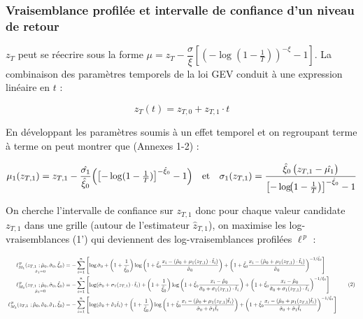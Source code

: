 \documentclass[
  article,
  nofooter,
  noheadings]{jss}
\begin{document}
\subsubsection{Vraisemblance profilée et intervalle de confiance d'un
niveau de
retour}\label{vraisemblance-profiluxe9e-et-intervalle-de-confiance-dun-niveau-de-retour}

\(z_T\) peut se réecrire sous la forme
\(\mu = z_T - \dfrac{\sigma}{\xi} \left[ \left( -\log\left(1 - \frac{1}{T} \right) \right)^{-\xi} - 1 \right]\).
La combinaison des paramètres temporels de la loi GEV conduit à une
expression linéaire en \(t\) :

\[
z_T(t) = z_{T,0} + z_{T,1} \cdot t
\]

En développant les paramètres soumis à un effet temporel et on
regroupant terme à terme on peut montrer que (Annexes 1-2) :

\[
\mu_1(z_{T,1}) = z_{T,1} -\dfrac{\hat{\sigma_1}}{\hat{\xi}_0}\Bigl(\bigl[-\log(1-\tfrac1T)\bigr]^{-\hat{\xi}_0}-1\Bigr) \quad \text{et} \quad
\sigma_1(z_{T,1}) = \dfrac{\hat{\xi}_0\,\bigl(z_{T,1}-\hat{\mu_1}\bigr)}{\bigl[-\log\!\bigl(1-\tfrac1T\bigr)\bigr]^{-\hat{\xi}_0}-1}
\]

On cherche l'intervalle de confiance sur \(z_{T,1}\) donc pour chaque
valeur candidate \(z_{T,1}\) dans une grille (autour de l'estimateur
\(\hat{z}_{T,1}\)), on maximise les log-vraisemblances (1') qui
deviennent des log-vraisemblances profilées \(\ell^{\,p}\) :

\[
\scalebox{0.7}{
\(
\begin{aligned}
\underset{\hat{\sigma}_1 = 0}{\ell_{M_1}^{\,p}(z_{T,1} \ ; \hat{\mu}_0, \hat{\sigma}_0, \hat{\xi}_0)} &= 
-\sum_{i=1}^n \left[
\log \hat{\sigma}_0 +
\left(1 + \frac{1}{\hat{\xi}_0} \right) \log \left(1 + \hat{\xi}_0 \frac{x_i - (\hat{\mu}_0 + \mu_1(z_{T,1}) \cdot \tilde{t}_i)}{\hat{\sigma}_0} \right) +
\left(1 + \hat{\xi}_0 \frac{x_i - (\hat{\mu}_0 + \mu_1(z_{T,1}) \cdot \tilde{t}_i)}{\hat{\sigma}_0} \right)^{-1/\hat{\xi}_0}
\right]\\
\underset{\hat{\mu}_1 = 0}{\ell_{M_2}^{\,p}(z_{T,1} \ ; \hat{\mu}_0, \hat{\sigma}_0, \hat{\xi}_0)} &= 
-\sum_{i=1}^n \left[
\log (\hat{\sigma}_0 + \sigma_1(z_{T,1}) \cdot \tilde{t}_i) +
\left(1 + \frac{1}{\hat{\xi}_0} \right) \log \left(1 + \hat{\xi}_0 \frac{x_i - \hat{\mu}_0}{\hat{\sigma}_0 + \sigma_1(z_{T,1}) \cdot \tilde{t}_i} \right) +
\left(1 + \hat{\xi}_0 \frac{x_i - \hat{\mu}_0}{\hat{\sigma}_0 + \sigma_1(z_{T,1}) \cdot \tilde{t}_i} \right)^{-1/\hat{\xi}_0}
\right]\\
\ell_{M_3}^{\,p}(z_{T,1} \ ; \hat{\mu}_0, \hat{\sigma}_0, \hat{\sigma}_1, \hat{\xi}_0) &= 
-\sum_{i=1}^n \left[
\log (\hat{\sigma}_0 + \hat{\sigma}_1 \tilde{t}_i) +
\left(1 + \frac{1}{\hat{\xi}_0} \right) \log \left(1 + \hat{\xi}_0 \frac{x_i - (\hat{\mu}_0 + \mu_1(z_{T,1}) \tilde{t}_i)}{\hat{\sigma}_0 + \hat{\sigma}_1 \tilde{t}_i} \right) +
\left(1 + \hat{\xi}_0 \frac{x_i - (\hat{\mu}_0 + \mu_1(z_{T,1}) \tilde{t}_i)}{\hat{\sigma}_0 + \hat{\sigma}_1 \tilde{t}_i} \right)^{-1/\hat{\xi}_0}
\right]\\
\end{aligned}
\tag{2}
\)
}
\]
\end{document}
